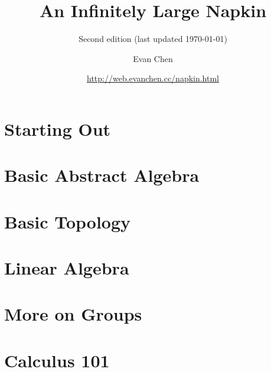 \documentclass[11pt,twoside=semi,openright,numbers=noenddot]{scrreprt}
\begin{document}
\doparttoc[n]

\title{An Infinitely Large Napkin}
\subtitle{Second edition (last updated \today)}
\author{Evan Chen}
\date{\url{http://web.evanchen.cc/napkin.html}}
\maketitle




\tableofcontents


\part{Starting Out}



\part{Basic Abstract Algebra}




\part{Basic Topology}



\part{Linear Algebra}








\part{More on Groups}




\part{Calculus 101}




\end{document}
